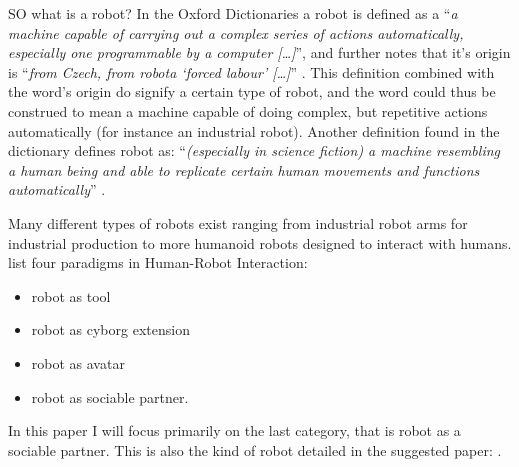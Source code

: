 SO what is a robot? In the Oxford Dictionaries a robot is defined as a ``\textit{a machine capable of carrying out a complex series of actions automatically, especially one programmable by a computer [\dots]}'', and further notes that it's origin is ``\textit{from Czech, from robota `forced labour' [\dots]}'' \parencite{OxfordDictionaries2010robot}. This definition combined with the word's origin do signify a certain type of robot, and the word could thus be construed to mean a machine capable of doing complex, but repetitive actions automatically (for instance an industrial robot). Another definition found in the dictionary defines robot as: ``\textit{(especially in science fiction) a machine resembling a human being and able to replicate certain human movements and functions automatically}'' \parencite{OxfordDictionaries2010robot}.

Many different types of robots exist ranging from industrial robot arms for industrial production to more humanoid robots designed to interact with humans. \textcite{Breazeal2004robot} list four paradigms in Human-Robot Interaction:
\begin{itemize}
	\item robot as tool
	\item robot as cyborg extension
	\item robot as avatar
	\item robot as sociable partner.
\end{itemize}
In this paper I will focus primarily on the last category, that is robot as a sociable partner. This is also the kind of robot detailed in the suggested paper: .
